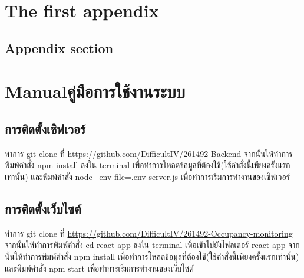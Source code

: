 \chapter{The first appendix}


\section{Appendix section}










\chapter{\ifenglish Manual\else คู่มือการใช้งานระบบ\fi}

\section{การติดตั้งเซิฟเวอร์}
    ทำการ git clone ที่ \url{https://github.com/DifficultIV/261492-Backend} จากนั้นให้ทำการพิมพ์คำสั่ง npm install ลงใน terminal เพื่อทำการโหลดข้อมูลที่ต้องใช้(ใช้คำสั่งนี้เพียงครั้งแรกเท่านั้น) และพิมพ์คำสั่ง node --env-file=.env server.js เพื่อทำการเริ่มการทำงานของเซิฟเวอร์

\section{การติดตั้งเว็บไซต์}    
    ทำการ git clone ที่ \url{https://github.com/DifficultIV/261492-Occupancy-monitoring} จากนั้นให้ทำการพิมพ์คำสั่ง cd react-app ลงใน terminal เพื่อเข้าไปยังโฟลเดอร์ react-app จากนั้นให้ทำการพิมพ์คำสั่ง npm install เพื่อทำการโหลดข้อมูลที่ต้องใช้(ใช้คำสั่งนี้เพียงครั้งแรกเท่านั้น) และพิมพ์คำสั่ง npm start เพื่อทำการเริ่มการทำงานของเว็บไซต์